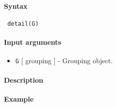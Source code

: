 


	\paragraph{Syntax}
 
 \begin{verbatim}
 detail(G)
 \end{verbatim}
 
 \paragraph{Input arguments}
 
 \begin{itemize}
 \item
   \texttt{G} {[} grouping {]} - Grouping object.
 \end{itemize}
 
 \paragraph{Description}
 
 \paragraph{Example}


